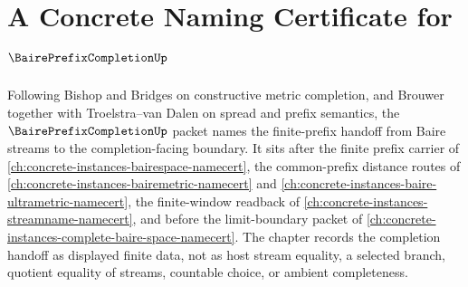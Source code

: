 \chapter{A Concrete Naming Certificate for $\BairePrefixCompletionUp$}
\label{ch:concrete-instances-baire-prefix-completion-namecert}

Following Bishop and Bridges on constructive metric completion, and Brouwer together with Troelstra--van Dalen on spread and prefix semantics, the $\BairePrefixCompletionUp$ packet names the finite-prefix handoff from Baire streams to the completion-facing boundary. It sits after the finite prefix carrier of \autoref{ch:concrete-instances-bairespace-namecert}, the common-prefix distance routes of \autoref{ch:concrete-instances-bairemetric-namecert} and \autoref{ch:concrete-instances-baire-ultrametric-namecert}, the finite-window readback of \autoref{ch:concrete-instances-streamname-namecert}, and before the limit-boundary packet of \autoref{ch:concrete-instances-complete-baire-space-namecert}. The chapter records the completion handoff as displayed finite data, not as host stream equality, a selected branch, quotient equality of streams, countable choice, or ambient completeness.

